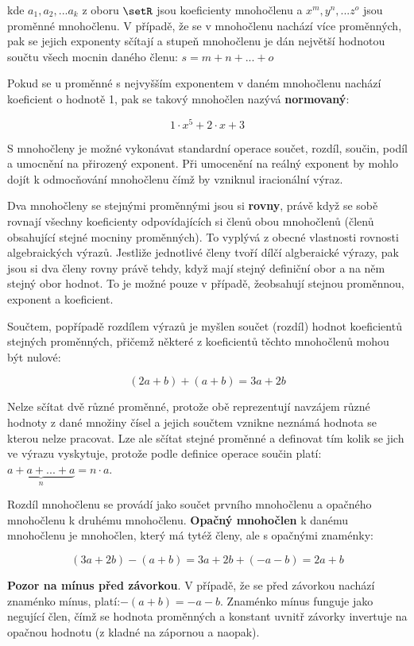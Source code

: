 kde $a_1, a_2, ... a_k$ z oboru $\setR$ jsou koeficienty mnohočlenu a $x^{m}, y^{n}, ... z^{o}$ jsou proměnné mnohočlenu. V případě, že se v mnohočlenu nachází více proměnných, pak se jejich exponenty sčítají a stupeň mnohočlenu je dán největší hodnotou součtu všech mocnin daného členu: $s = m + n + ... + o$


Pokud se u proměnné s nejvyšším exponentem v daném mnohočlenu nachází koeficient o hodnotě 1, pak se takový mnohočlen nazývá {\bf normovaný}:

$$ 1\cdot x^5 + 2\cdot x +3$$



S mnohočleny je možné vykonávat standardní operace součet, rozdíl, součin, podíl a umocnění na přirozený exponent. Při umocenění na reálný exponent by mohlo dojít k odmocňování mnohočlenu čímž by vzniknul iracionální výraz. 

Dva mnohočleny se stejnými proměnnými jsou si {\bf rovny}, právě když se sobě rovnají všechny koeficienty odpovídajících si členů obou mnohočlenů (členů obsahující stejné mocniny proměnných). To vyplývá z obecné vlastnosti rovnosti algebraických výrazů. Jestliže jednotlivé členy tvoří dílčí algberaické výrazy, pak jsou si dva členy rovny právě tehdy, když mají stejný definiční obor a na něm stejný obor hodnot. To je možné pouze v případě, žeobsahují stejnou proměnnou, exponent a koeficient. 



Součtem, popřípadě rozdílem výrazů je myšlen součet (rozdíl) hodnot koeficientů stejných proměnných, přičemž některé z koeficientů těchto mnohočlenů mohou být nulové:

$$ (2a+b) + (a+b) = 3a + 2b $$

Nelze sčítat dvě různé proměnné, protože obě reprezentují navzájem různé hodnoty z dané množiny čísel a jejich součtem vznikne neznámá hodnota se kterou nelze pracovat. Lze ale sčítat stejné proměnné a definovat tím kolik se jich ve výrazu vyskytuje, protože podle definice operace součin platí: $\underbrace{a+a+...+a}_n = n\cdot a$.

Rozdíl mnohočlenu se provádí jako součet prvního mnohočlenu a opačného mnohočlenu k druhému mnohočlenu. {\bf Opačný mnohočlen} k danému mnohočlenu je mnohočlen, který má tytéž členy, ale s opačnými znaménky:

$$ (3a+2b) - (a+b) = 3a + 2b + (-a -b) =  2a + b $$

{\bf Pozor na mínus před závorkou}. V případě, že se před závorkou nachází znaménko mínus, platí:$-(a+b)=-a-b$. Znaménko mínus funguje jako negující člen, čímž se hodnota proměnných a konstant uvnitř závorky invertuje na opačnou hodnotu (z kladné na zápornou a naopak).

